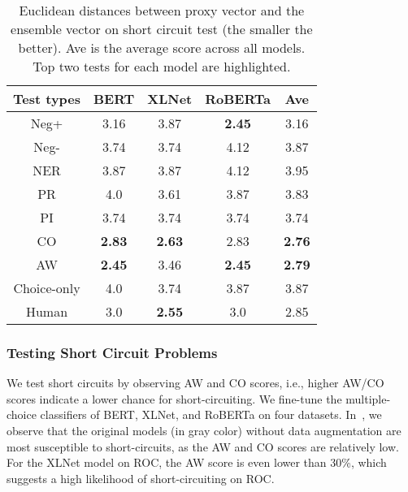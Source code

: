 
\begin{table}[th]
\small
\centering
\begin{tabular}{c|cccc}\hline
\toprule  
\textbf{Test types} &BERT  & XLNet & RoBERTa  &Ave\\ 
 \midrule
{Neg+}      &     3.16	&3.87&	\textbf{2.45}	&3.16\\
\midrule
{Neg-}&    3.74&3.74&	4.12&	3.87\\
\midrule
{NER}    &    3.87&	3.87	&4.12	&3.95\\
\midrule
{PR}&   4.0&	3.61&	3.87	&3.83\\
\midrule
{PI}&    3.74	&3.74&	3.74&	3.74\\
\midrule
{CO}            & \textbf{ 2.83}	&\textbf{2.63}	&2.83	&\textbf{2.76}\\
\midrule
{AW}   &  \textbf{2.45}	&3.46&	\textbf{2.45}	&\textbf{2.79} \\
\midrule
{Choice-only}   &     4.0&	3.74&	3.87&	3.87\\
\midrule
{Human}   &3.0&	\textbf{2.55}&	3.0&	2.85\\
\bottomrule
\hline
\end{tabular}
\caption{\label{tab:agree} 
Euclidean distances between proxy vector and 
the ensemble vector on short circuit test (the smaller
the better). 
Ave is the average score across all models.
Top two tests for each model are highlighted.}
\end{table}

\subsubsection{Testing Short Circuit Problems}
\label{sec:fix-sc}
We test short circuits by observing AW and CO scores, i.e., higher AW/CO scores indicate a lower chance for short-circuiting. We fine-tune the multiple-choice classifiers of BERT, XLNet, and RoBERTa on four datasets. In~, we observe that the original models (in gray color) without data augmentation are most susceptible to short-circuits, as the AW and CO scores are relatively low. For the XLNet model on ROC, the AW score is even lower than 30\%, which suggests a high likelihood of short-circuiting on ROC.


